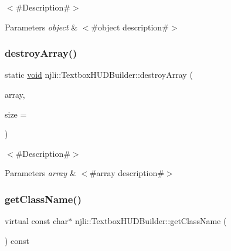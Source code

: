 $<$\#\+Description\#$>$


\begin{DoxyParams}{Parameters}
{\em object} & $<$\#object description\#$>$ \\
\hline
\end{DoxyParams}
\mbox{\label{classnjli_1_1_textbox_h_u_d_builder_abd9e00950d569b8a887bbac1ee1356de}} 
\subsubsection{\texorpdfstring{destroy\+Array()}{destroyArray()}}
{\footnotesize\ttfamily static \mbox{\hyperlink{_thread_8h_af1e856da2e658414cb2456cb6f7ebc66}{void}} njli\+::\+Textbox\+H\+U\+D\+Builder\+::destroy\+Array (\begin{DoxyParamCaption}\item[{\mbox{\hyperlink{classnjli_1_1_textbox_h_u_d_builder}{Textbox\+H\+U\+D\+Builder}} $\ast$$\ast$}]{array,  }\item[{const \mbox{\hyperlink{_util_8h_a10e94b422ef0c20dcdec20d31a1f5049}{u32}}}]{size = {} }\end{DoxyParamCaption})\hspace{0.3cm}{\ttfamily [static]}}

$<$\#\+Description\#$>$


\begin{DoxyParams}{Parameters}
{\em array} & $<$\#array description\#$>$ \\
\hline
\end{DoxyParams}
\mbox{\label{classnjli_1_1_textbox_h_u_d_builder_adb69c0f10b0407353d8cf9e8fe4d1d1b}} 
\subsubsection{\texorpdfstring{get\+Class\+Name()}{getClassName()}}
{\footnotesize\ttfamily virtual const char$\ast$ njli\+::\+Textbox\+H\+U\+D\+Builder\+::get\+Class\+Name (\begin{DoxyParamCaption}{ }\end{DoxyParamCaption}) const\hspace{0.3cm}{\ttfamily [virtual]}}

